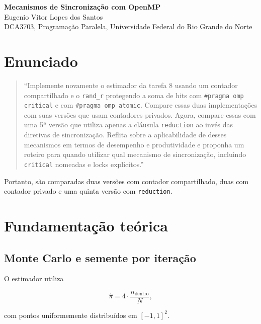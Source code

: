 \documentclass[11pt,letterpaper]{article}
\begin{document}
\pagestyle{plain}

\begin{center}

{\LARGE\bfseries Mecanismos de Sincronização com OpenMP}\\[0.4em]

{\normalsize Eugenio Vitor Lopes dos Santos}\\[0.3em]

{\small DCA3703, Programação Paralela, Universidade Federal do Rio Grande do Norte}\\[0.3em]

\end{center}

\section{Enunciado}

\begin{quote}
``Implemente novamente o estimador da tarefa 8 usando um contador
compartilhado e o \texttt{rand\_r} protegendo a soma de hits com
\texttt{\#pragma omp critical} e com \texttt{\#pragma omp atomic}.
Compare essas duas implementações com suas versões que usam contadores
privados. Agora, compare essas com uma 5ª versão que utiliza apenas a
cláusula \texttt{reduction} ao invés das diretivas de sincronização.
Reflita sobre a aplicabilidade de desses mecanismos em termos de desempenho
e produtividade e proponha um roteiro para quando utilizar qual mecanismo
de sincronização, incluindo \texttt{critical} nomeadas e locks explícitos.''
\end{quote}

Portanto, são comparadas duas versões com contador compartilhado, duas
com contador privado e uma quinta versão com \texttt{reduction}.

\section{Fundamentação teórica}

\subsection{Monte Carlo e semente por iteração}

O estimador utiliza

\[
\hat{\pi}=4\cdot\frac{n_{\mathrm{dentro}}}{N},
\]

com pontos uniformemente distribuídos em $[-1,1]^2$.
\end{document}
